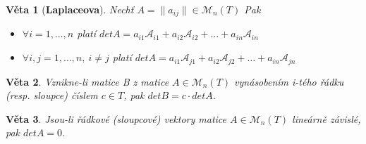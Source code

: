 \documentclass[12pt,a4paper]{article}
\newtheorem{sentence}{Věta}
\begin{document}
\begin{sentence}[\textbf{Laplaceova}]
	Nechť $A = \| a_{ij} \|  \in \mathscr{M}_n(T)$ Pak
	\begin{itemize}
		\item[a)] $\forall i = 1, \dots, n$ platí $detA =  a_{i1}\mathscr{A}_{i1} +  a_{i2}\mathscr{A}_{i2} + \dots +  a_{in}\mathscr{A}_{in}$
		\item[b)] $\forall i,j = 1, \dots, n,\ i \not=j$ platí $detA =  a_{i1}\mathscr{A}_{j1} +  a_{i2}\mathscr{A}_{j2} + \dots +  a_{in}\mathscr{A}_{jn}$
	\end{itemize}
\end{sentence}

\begin{sentence}
	Vznikne-li matice B z matice $A \in \mathscr{M}_n(T)$ vynásobením i-tého řádku (resp. sloupce) číslem $c \in T$, pak $detB = c \cdot detA$.
\end{sentence}

\begin{sentence}
	Jsou-li řádkové (sloupcové) vektory matice $A \in \mathscr{M}_n(T)$ lineárně závislé, pak $detA = 0$.
\end{sentence}
\end{document}
